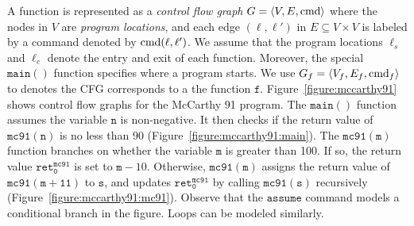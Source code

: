A function is represented as a \emph{control flow graph} $G = \langle
V, E,\textmd{cmd} \rangle$ where the nodes in $V$ are \emph{program locations}, and
each edge $(\ell, \ell')$ in $E \subseteq V \times V$ is labeled by a
command denoted by $\textmd{cmd} (\ell, \ell')$. We
assume that the program locations $\ell_s$ and $\ell_e$ denote the
entry and exit of each function. Moreover, the special
$\mathtt{main()}$ function specifies where a program starts.
We use $G_f=\langle
V_f, E_f,\textmd{cmd}_f \rangle$ to denotes the CFG corresponds to a the function $\mathtt{f}$.
Figure~\ref{figure:mccarthy91} shows control flow graphs for the
McCarthy 91 program. The $\mathtt{main()}$ function assumes the
variable $\mathtt{n}$ is non-negative. It then checks if the return
value of $\mathtt{mc91(n)}$ is no less than 90
(Figure~\ref{figure:mccarthy91:main}). The $\mathtt{mc91(m)}$ function
branches on whether the variable $\mathtt{m}$ is greater than 100. If
so, the return value $\mathtt{ret^{mc91}_0}$ is set to $\mathtt{m} -
10$. Otherwise, 
$\mathtt{mc91(m)}$ assigns the return value of $\mathtt{mc91(m + 11)}$
to $\mathtt{s}$, and updates $\mathtt{ret^{mc91}_0}$ by calling
$\mathtt{mc91(s)}$ recursively
(Figure~\ref{figure:mccarthy91:mc91}). Observe that the 
$\mathtt{assume}$ command models a conditional branch in the
figure. Loops can be modeled similarly.


